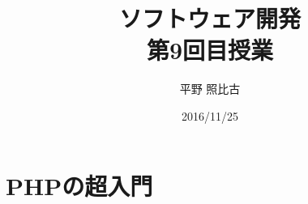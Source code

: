 
\title{ソフトウェア開発\\第9回目授業}
\author{平野 照比古}
\institute{}
\date{2016/11/25}
\newtheorem{Prob}{解説}
\newcommand{\Elm}[1]{\texttt{<#1>}}

\newcommand{\DOMM}{\texttt}
\newcommand{\Event}{\texttt}
\newcommand{\DOMP}{\texttt}
\newcommand{\DOM}{\texttt{DOM}}
\newcommand{\keyitem}{\relax}
\newcommand{\HTML}{HTML文書}

\frame{\maketitle}
\section{PHPの超入門}
